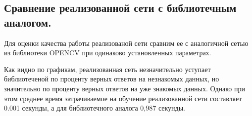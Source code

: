 \subsection{Сравнение реализованной сети с библиотечным аналогом.}
Для оценки качества работы реализованой сети сравним ее с аналогичной сетью из библиотеки OPENCV при одинаково установленных параметрах.
\begin{figure}[H]
\end{figure}
\begin{figure}[H]
\end{figure}
Как видно по графикам, реализованная сеть незначительно уступает библиотеченой по проценту верных ответов на незнакомых данных, но значительно по проценту верных ответов на уже знакомых данных. Однако при этом среднее время затрачиваемое на обучение реализованной сети составляет 0.001 секунды, а для библиотечного аналога 0,987 секунды.
